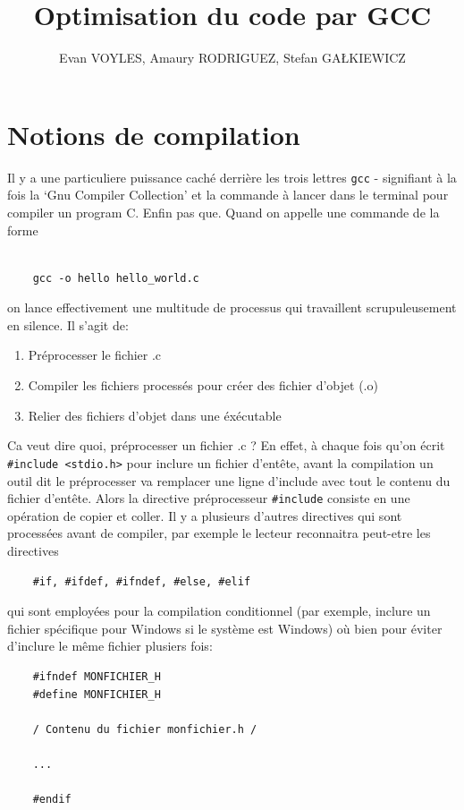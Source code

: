 \documentclass[11pt]{article} %
\title{Optimisation du code par GCC}
\author{Evan VOYLES, Amaury RODRIGUEZ, Stefan GA\L KIEWICZ}
\begin{document}
\maketitle

\section*{Notions de compilation}
Il y a une particuliere puissance caché derrière les trois lettres \verb|gcc| - signifiant à la fois
la `Gnu Compiler Collection' et la commande à lancer dans le terminal pour compiler un program C. Enfin pas que.
Quand on appelle une commande de la forme
\begin{verbatim}

    gcc -o hello hello_world.c
\end{verbatim}
on lance effectivement une multitude de processus qui travaillent scrupuleusement en silence.
Il s'agit de:
\begin{enumerate}
    \item Préprocesser le fichier .c
    \item Compiler les fichiers processés pour créer des fichier d'objet (.o)
    \item Relier des fichiers d'objet dans une éxécutable
\end{enumerate}

Ca veut dire quoi, préprocesser un fichier .c ? En effet, à chaque fois qu'on
écrit \verb|#include <stdio.h>| pour inclure un fichier d'entête, avant la compilation
un outil dit le préprocesser va remplacer une ligne d'include avec tout le contenu du fichier d'entête.
Alors la directive préprocesseur \verb|#include| consiste en une opération de copier et coller. Il y a plusieurs d'autres directives qui sont processées avant de compiler,
par exemple le lecteur reconnaitra peut-etre les directives
\begin{verbatim}
    #if, #ifdef, #ifndef, #else, #elif
\end{verbatim}
qui sont employées
pour la compilation conditionnel (par exemple, inclure un fichier spécifique pour Windows si le système est Windows)
où bien pour éviter d'inclure le même fichier plusiers fois:
\begin{verbatim}
    #ifndef MONFICHIER_H
    #define MONFICHIER_H

    / Contenu du fichier monfichier.h /

    ...

    #endif
\end{verbatim}
\end{document}
